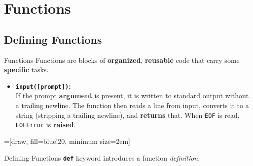     \section{Functions}
        \subsection{Defining Functions}
        \begin{frame}{Functions}
            \pause
            \LARGE
            Functions are blocks of \textbf{organized}, \textbf{reusable} code that carry some \textbf{specific} tasks.
            \pause
            \begin{itemize}
                \item \textbf{\texttt{input([prompt])}:} \\
                \pause
                If the prompt \textbf<5->{argument} is present, it is written to standard output without a trailing newline. The function then reads a line from input, converts it to a string (stripping a trailing newline), and \textbf<5->{returns} that. When \texttt{EOF} is read, \texttt{EOFError} is \textbf<5->{raised}.   
            \end{itemize}

            \pause
            \pause

            \begin{center}
                =[draw, fill=blue!20, minimum size=2em]

            \end{center}
        \end{frame}   
 
        \begin{frame}{Defining Functions}
            \pause
            \LARGE
            \textbf{\texttt{def}} keyword introduces a function \textit{definition}.
            \normalsize
            \pause
            \inputminted[frame=single,framesep=2pt, lastline=8]{python3}{code-examples/function_def.py}
            \pause
            \inputminted[frame=single,framesep=2pt, lastline=8]{python3}{code-examples/function_def2.py}
            \pause
            \inputminted[frame=single,framesep=2pt, lastline=8]{python3}{code-examples/function_def3.py}
        \end{frame}


